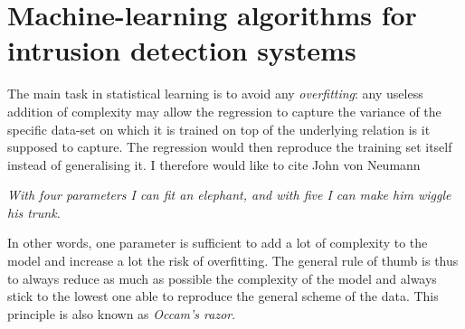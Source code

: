 \chapter{Machine-learning algorithms for intrusion detection systems}
\label{cha:2}
The main task in statistical learning is to avoid any \emph{overfitting}: any useless addition of complexity may allow the regression to capture the variance of the specific data-set on which it is trained on top of the underlying relation is it supposed to capture. The regression would then reproduce the training set itself instead of generalising it. I therefore would like to cite John von Neumann
\begin{displayquote}
\emph{With four parameters I can fit an elephant, and with five I can make him wiggle his trunk.}
\end{displayquote}

In other words, one parameter is sufficient to add a lot of complexity to the model and increase a lot the risk of overfitting. The general rule of thumb is thus to always reduce as much as possible the complexity of the model and always stick to the lowest one able to reproduce the general scheme of the data. This principle is also known as \emph{Occam's razor}.








\FloatBarrier